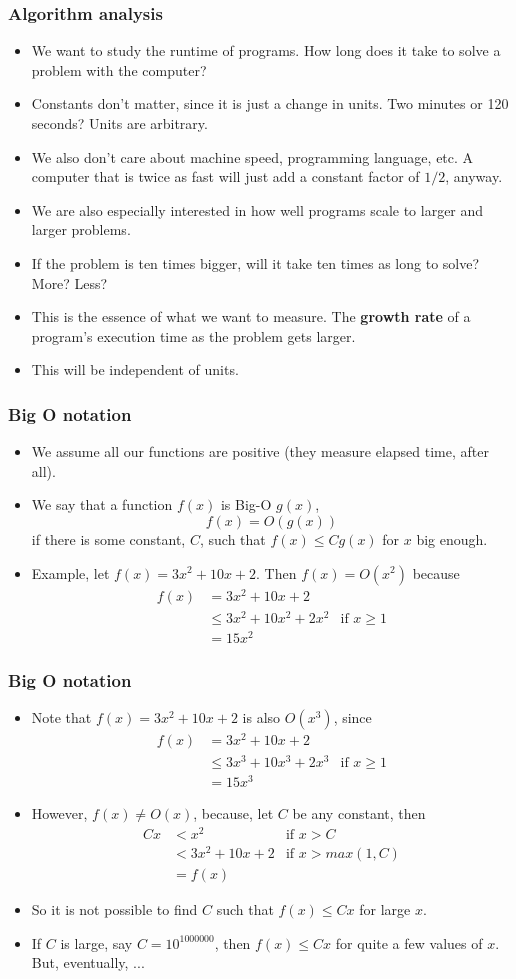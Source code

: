 \documentclass{beamer}
\newcommand{\bi}{\begin{itemize}}
\newcommand{\li}{\item}
\newcommand{\ei}{\end{itemize}}
\newcommand{\bfr}[1]{\begin{frame}[fragile]\frametitle{{ #1 }}}
\begin{document}
\bfr{Algorithm analysis}
\bi
\li We want to study the runtime of programs.  How long does it take
to solve a problem with the computer?
\li Constants don't matter, since it is just a change in units.
Two minutes or 120 seconds?  Units are arbitrary.
\li We also don't care about machine speed, programming language, etc.
A computer that is twice as fast will just add a constant
factor of $1/2$, anyway.
\li We are also especially interested in how well
programs scale to larger and larger problems.
\li
If the problem is ten times bigger, will it take
ten times as long to solve?  More?  Less?
\li
This is the essence of what we want to measure.
The {\bf growth rate} of a program's execution time as the
problem gets larger.
\li
This will be independent of units.
\ei

\end{frame}

\bfr{Big O notation}
\bi
\li We assume all our functions are positive (they measure elapsed time, after all).
\li We say that a function $f(x)$ is  Big-O   $g(x)$, 
\[ f(x) = O(g(x)) \]
if there is some constant, $C$, such that $f(x) \leq Cg(x)$
for $x$ big enough.
\li Example, let $f(x) = 3x^2 + 10x + 2$.  Then $f(x) = O(x^2)$ because
\begin{align*}
f(x) &= 
3x^2 + 10x + 2 \\
&\leq 3x^2 + 10x^2 + 2x^2 & \mbox{if }x \geq 1\\
  &= 15x^2
\end{align*}
\ei

\end{frame}
\bfr{Big O notation}
\bi
\li Note that $f(x) = 3x^2 + 10x + 2$
is also $O(x^3)$, since
\begin{align*}
f(x) &= 
3x^2 + 10x + 2 \\
&\leq 3x^3 + 10x^3 + 2x^3 & \mbox{if }x \geq 1\\
  &= 15x^3
\end{align*}
\li However, $f(x) \not = O(x)$, because,
let $C$ be any constant, then
\begin{align*}
Cx &< x^2 &\mbox{if } x > C\\
   &< 3x^2 + 10x + 2 &\mbox{if } x > max(1,C)\\
   &= f(x)
\end{align*}
\li
So it is not possible to find $C$
such that $f(x) \leq Cx$ for large $x$.
\li If $C$ is large, say $C = 10^{1000000}$,
then $f(x) \leq Cx$ for quite a few values
of $x$.  But, eventually, ...
\ei
\end{frame}
\end{document}
